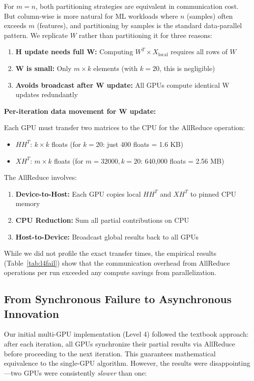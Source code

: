 \documentclass[11pt]{article}
\begin{document}
For $m = n$, both partitioning strategies are equivalent in communication cost. But column-wise is more natural for ML workloads where $n$ (samples) often exceeds $m$ (features), and partitioning by samples is the standard data-parallel pattern. We replicate $W$ rather than partitioning it for three reasons:

\begin{enumerate}
    \item \textbf{H update needs full W:} Computing $W^T \times X_{\text{local}}$ requires all rows of $W$
    \item \textbf{W is small:} Only $m \times k$ elements (with $k=20$, this is negligible)
    \item \textbf{Avoids broadcast after W update:} All GPUs compute identical W updates redundantly
\end{enumerate}

\textbf{Per-iteration data movement for W update:}

Each GPU must transfer two matrices to the CPU for the AllReduce operation:
\begin{itemize}
    \item $HH^T$: $k \times k$ floats (for $k=20$: just 400 floats = 1.6 KB)
    \item $XH^T$: $m \times k$ floats (for $m=32000, k=20$: 640,000 floats = 2.56 MB)
\end{itemize}

The AllReduce involves:
\begin{enumerate}
    \item \textbf{Device-to-Host:} Each GPU copies local $HH^T$ and $XH^T$ to pinned CPU memory
    \item \textbf{CPU Reduction:} Sum all partial contributions on CPU
    \item \textbf{Host-to-Device:} Broadcast global results back to all GPUs
\end{enumerate}

While we did not profile the exact transfer times, the empirical results (Table~\ref{tab:l4fail}) show that the communication overhead from AllReduce operations per run exceeded any compute savings from parallelization.

\subsection{From Synchronous Failure to Asynchronous Innovation}

Our initial multi-GPU implementation (Level 4) followed the textbook approach: after each iteration, all GPUs synchronize their partial results via AllReduce before proceeding to the next iteration. This guarantees mathematical equivalence to the single-GPU algorithm. However, the results were disappointing---two GPUs were consistently \textit{slower} than one:
\end{document}
